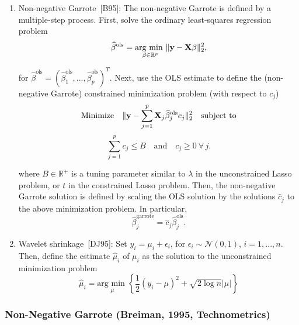 \documentclass[twoside]{article}
\renewcommand{\cite}[1]{[#1]}
\newcommand\R{\mathbb{R}}
\begin{document}
\begin{enumerate}
	\item Non-negative Garrote~\cite{B95}: The non-negative Garrote is defined by a multiple-step process. First, solve the ordinary least-squares regression problem
	\begin{equation*}
		\widehat\beta^\text{ols} = \underset{\beta \in \R^p}{\text{arg min~}} \| {\bf y} - {\bf X}\beta \|^2_2,
	\end{equation*}
	
	for $\widehat\beta^\text{ols} = \left(\widehat\beta^\text{ols}_1, ..., \widehat\beta^\text{ols}_p \right)^T$. Next, use the OLS estimate to define the (non-negative Garrote) constrained minimization problem (with respect to $c_j$)
	\begin{equation*}
		\text{Minimize} \quad \| {\bf y} - \sum^p_{j = 1}  {\bf X}_j \widehat\beta^\text{ols}_j c_j \|^2_2 \quad \text{subject to}
	\end{equation*}	
	\begin{equation*}
		\sum^p_{j = 1} c_j \leq B \quad \text{and} \quad c_j \geq 0~\forall\,j.
	\end{equation*}	
	
	where $B \in \R^+$ is a tuning parameter similar to $\lambda$ in the unconstrained Lasso problem, or $t$ in the constrained Lasso problem. Then, the non-negative Garrote solution is defined by scaling the OLS solution by the solutions $\widehat c_j$ to the above minimization problem. In particular,
	\begin{equation*}
		\widehat\beta^\text{garrote}_j = \widehat c_j \widehat \beta^\text{ols}_j.
	\end{equation*}
	
	\item Wavelet shrinkage~\cite{DJ95}: Set $y_i = \mu_i + \epsilon_i$, for $\epsilon_i \sim \mathcal N(0, 1)$, $i = 1, ..., n$. Then, define the estimate $\widehat\mu_i$ of $\mu_i$ as the solution to the unconstrained minimization problem
	\begin{equation*}
		\widehat\mu_i = \underset{\mu}{\text{arg min~}} \left\{ \frac{1}{2} \left(y_i - \mu\right)^2 + \sqrt{2\log n} |\mu| \right\}
	\end{equation*}
\end{enumerate}

\subsubsection{Non-Negative Garrote (Breiman, 1995, Technometrics)}
\end{document}
